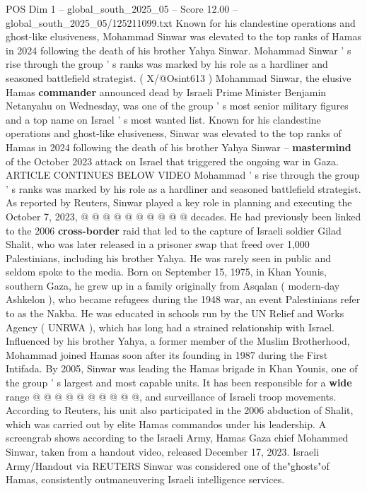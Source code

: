 \begin{textsample}{POS Dim 1 – global\_south\_2025\_05 – Score 12.00 – global\_south\_2025\_05/125211099.txt}  \label{ex:f1_pos_288}
Known for his clandestine operations and ghost-like elusiveness, Mohammad Sinwar was elevated to the top ranks of Hamas in 2024 following the death of his brother Yahya Sinwar.
Mohammad Sinwar ' s rise through the group ' s ranks was marked by his role as a hardliner and seasoned battlefield strategist. ( X/@Osint613 ) Mohammad Sinwar, the elusive Hamas \textbf{commander} announced dead by Israeli Prime Minister Benjamin Netanyahu on Wednesday, was one of the group ' s most senior military figures and a top name on Israel ' s most wanted list.
Known for his clandestine operations and ghost-like elusiveness, Sinwar was elevated to the top ranks of Hamas in 2024 following the death of his brother Yahya Sinwar -- \textbf{mastermind} of the October 2023 attack on Israel that triggered the ongoing war in Gaza.
ARTICLE CONTINUES BELOW VIDEO Mohammad ' s rise through the group ' s ranks was marked by his role as a hardliner and seasoned battlefield strategist.
As reported by Reuters, Sinwar played a key role in planning and executing the October 7, 2023, @ @ @ @ @ @ @ @ @ @ decades.
He had previously been linked to the 2006 \textbf{cross-border} raid that led to the capture of Israeli soldier Gilad Shalit, who was later released in a prisoner swap that freed over 1,000 Palestinians, including his brother Yahya.
He was rarely seen in public and seldom spoke to the media.
Born on September 15, 1975, in Khan Younis, southern Gaza, he grew up in a family originally from Asqalan ( modern-day Ashkelon ), who became refugees during the 1948 war, an event Palestinians refer to as the Nakba.
He was educated in schools run by the UN Relief and Works Agency ( UNRWA ), which has long had a strained relationship with Israel.
Influenced by his brother Yahya, a former member of the Muslim Brotherhood, Mohammad joined Hamas soon after its founding in 1987 during the First Intifada.
By 2005, Sinwar was leading the Hamas brigade in Khan Younis, one of the group ' s largest and most capable units.
It has been responsible for a \textbf{wide} range @ @ @ @ @ @ @ @ @ @, and surveillance of Israeli troop movements.
According to Reuters, his unit also participated in the 2006 abduction of Shalit, which was carried out by elite Hamas commandos under his leadership.
A screengrab shows according to the Israeli Army, Hamas Gaza chief Mohammed Sinwar, taken from a handout video, released December 17, 2023.
Israeli Army/Handout via REUTERS Sinwar was considered one of the"ghosts"of Hamas, consistently outmaneuvering Israeli intelligence services.

\end{textsample}

